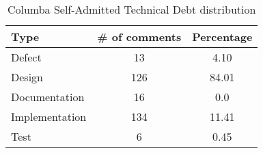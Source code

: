 \begin{table*}[!hbt]
      \begin{center}
            \caption{Columba Self-Admitted Technical Debt distribution}
            \label{tab:jfreechart_td_details}
            \begin{tabular}{l| c c }
            \toprule
            \textbf{Type}   & \textbf{\# of comments}     & \textbf{Percentage}  \\ \midrule 
             Defect          &  13              &4.10  \\     
             Design          &  126             &84.01 \\    
             Documentation   &  16              & 0.0  \\      
             Implementation  &  134             & 11.41\\    
             Test            &  6               & 0.45 \\  \bottomrule                                   
            \end{tabular}
      \end{center}
\end{table*}
